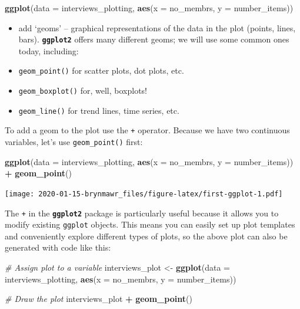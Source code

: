\documentclass[]{book}
\newenvironment{Shaded}{\begin{snugshade}}{\end{snugshade}}
\newcommand{\KeywordTok}[1]{\textcolor[rgb]{0.13,0.29,0.53}{\textbf{#1}}}
\newcommand{\DataTypeTok}[1]{\textcolor[rgb]{0.13,0.29,0.53}{#1}}
\newcommand{\StringTok}[1]{\textcolor[rgb]{0.31,0.60,0.02}{#1}}
\newcommand{\CommentTok}[1]{\textcolor[rgb]{0.56,0.35,0.01}{\textit{#1}}}
\newcommand{\OperatorTok}[1]{\textcolor[rgb]{0.81,0.36,0.00}{\textbf{#1}}}
\newcommand{\NormalTok}[1]{#1}
\begin{document}
\begin{Shaded}
\begin{Highlighting}[]
\KeywordTok{ggplot}\NormalTok{(}\DataTypeTok{data =}\NormalTok{ interviews_plotting, }\KeywordTok{aes}\NormalTok{(}\DataTypeTok{x =}\NormalTok{ no_membrs, }\DataTypeTok{y =}\NormalTok{ number_items))}
\end{Highlighting}
\end{Shaded}

\begin{itemize}
\item
  add `geoms' -- graphical representations of the data in the plot
  (points, lines, bars). \textbf{\texttt{ggplot2}} offers many different
  geoms; we will use some common ones today, including:
\item
  \texttt{geom\_point()} for scatter plots, dot plots, etc.
\item
  \texttt{geom\_boxplot()} for, well, boxplots!
\item
  \texttt{geom\_line()} for trend lines, time series, etc.
\end{itemize}

To add a geom to the plot use the \texttt{+} operator. Because we have
two continuous variables, let's use \texttt{geom\_point()} first:

\begin{Shaded}
\begin{Highlighting}[]
\KeywordTok{ggplot}\NormalTok{(}\DataTypeTok{data =}\NormalTok{ interviews_plotting, }\KeywordTok{aes}\NormalTok{(}\DataTypeTok{x =}\NormalTok{ no_membrs, }\DataTypeTok{y =}\NormalTok{ number_items)) }\OperatorTok{+}
\StringTok{    }\KeywordTok{geom_point}\NormalTok{()}
\end{Highlighting}
\end{Shaded}

\texttt{[image: 2020-01-15-brynmawr\_files/figure-latex/first-ggplot-1.pdf]}

The \texttt{+} in the \textbf{\texttt{ggplot2}} package is particularly
useful because it allows you to modify existing \texttt{ggplot} objects.
This means you can easily set up plot templates and conveniently explore
different types of plots, so the above plot can also be generated with
code like this:

\begin{Shaded}
\begin{Highlighting}[]
\CommentTok{# Assign plot to a variable}
\NormalTok{interviews_plot <-}\StringTok{ }\KeywordTok{ggplot}\NormalTok{(}\DataTypeTok{data =}\NormalTok{ interviews_plotting, }\KeywordTok{aes}\NormalTok{(}\DataTypeTok{x =}\NormalTok{ no_membrs, }\DataTypeTok{y =}\NormalTok{ number_items))}

\CommentTok{# Draw the plot}
\NormalTok{interviews_plot }\OperatorTok{+}
\StringTok{    }\KeywordTok{geom_point}\NormalTok{()}
\end{Highlighting}
\end{Shaded}
\end{document}
